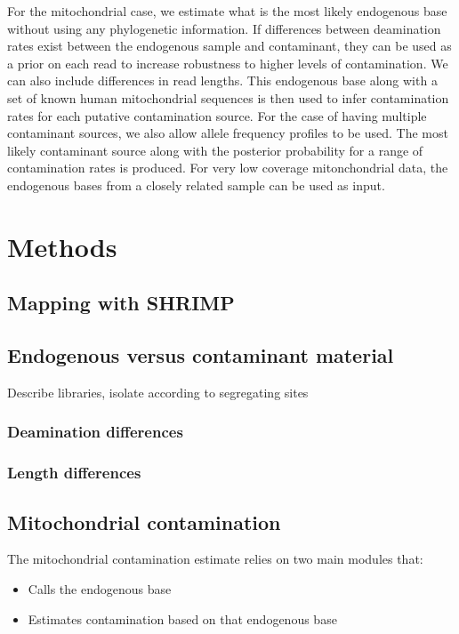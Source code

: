 \documentclass[a4paper,12pt]{article}
\begin{document}
For the mitochondrial case, we estimate what is the most likely endogenous base without using any phylogenetic information. If differences between deamination rates exist between the endogenous sample and contaminant, they can be used as a prior on each read to increase robustness to higher levels of contamination. We can also include differences in read lengths. This endogenous base along with a set of known human mitochondrial sequences is then used to infer contamination rates for each putative contamination source. For the case of having multiple contaminant sources, we also allow allele frequency profiles to be used. The most likely contaminant source along with the posterior probability for a range of contamination rates is produced. For very low coverage mitonchondrial data, the endogenous bases from a closely related sample can be used as input. 


\section{Methods}

\subsection{Mapping with SHRIMP}

\subsection{Endogenous versus contaminant material}
Describe libraries, isolate according to segregating sites

\subsubsection{Deamination differences}


\subsubsection{Length differences}


\subsection{Mitochondrial contamination}

The mitochondrial contamination estimate relies on two main modules that:

\begin{itemize}
\item Calls the endogenous base
\item Estimates contamination based on that endogenous base
\end{itemize}
\end{document}
